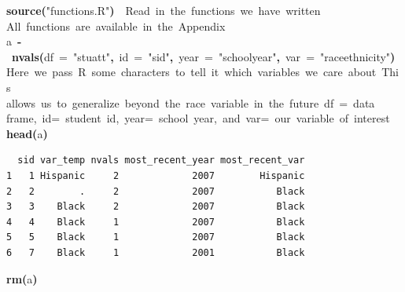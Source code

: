 \documentclass[12pt]{article}
\makeatletter
\newcommand{\hlfunctioncall}[1]{\textcolor[rgb]{0.501960784313725,0,0.329411764705882}{\textbf{#1}}}%
\newcommand{\hlstring}[1]{\textcolor[rgb]{0.6,0.6,1}{#1}}%
\newcommand{\hlkeyword}[1]{\textcolor[rgb]{0,0,0}{\textbf{#1}}}%
\newcommand{\hlargument}[1]{\textcolor[rgb]{0.690196078431373,0.250980392156863,0.0196078431372549}{#1}}%
\newcommand{\hlcomment}[1]{\textcolor[rgb]{0.180392156862745,0.6,0.341176470588235}{#1}}%
\newcommand{\hlassignement}[1]{\textcolor[rgb]{0,0,0}{\textbf{#1}}}%
\newcommand{\hlsymbol}[1]{\textcolor[rgb]{0,0,0}{#1}}%
\newcommand{\hlstd}[1]{\textcolor[rgb]{0,0,0}{#1}}%
\newenvironment{kframe}{%
 \def\FrameCommand##1{\hskip\@totalleftmargin \hskip-\fboxsep
 \colorbox{shadecolor}{##1}\hskip-\fboxsep
     \hskip-\linewidth \hskip-\@totalleftmargin \hskip\columnwidth}%
 \MakeFramed {\advance\hsize-\width
   \@totalleftmargin\z@ \linewidth\hsize
   \@setminipage}}%
 {\par\unskip\endMakeFramed}
\newenvironment{knitrout}{}{} %
\renewenvironment{knitrout}{\begin{footnotesize}}{\end{footnotesize}}
\makeatother
\begin{document}
\begin{knitrout}
\color{fgcolor}\begin{kframe}
\begin{flushleft}
\ttfamily\noindent
\hlfunctioncall{source}\hlkeyword{(}\hlstring{"{}functions.R"{}}\hlkeyword{)}{\ }{\ }\hlcomment{\usebox{\hlnormalsizeboxhash}{\ }Read{\ }in{\ }the{\ }functions{\ }we{\ }have{\ }written}\hspace*{\fill}\\
\hlstd{}\hlcomment{\usebox{\hlnormalsizeboxhash}{\ }All{\ }functions{\ }are{\ }available{\ }in{\ }the{\ }Appendix}\hspace*{\fill}\\
\hlstd{}\hlsymbol{a}{\ }\hlassignement{\usebox{\hlnormalsizeboxlessthan}-}{\ }\hlfunctioncall{nvals}\hlkeyword{(}\hlargument{df}{\ }\hlargument{=}{\ }\hlstring{"{}stuatt"{}}\hlkeyword{,}{\ }\hlargument{id}{\ }\hlargument{=}{\ }\hlstring{"{}sid"{}}\hlkeyword{,}{\ }\hlargument{year}{\ }\hlargument{=}{\ }\hlstring{"{}school\usebox{\hlnormalsizeboxunderscore}year"{}}\hlkeyword{,}{\ }\hlargument{var}{\ }\hlargument{=}{\ }\hlstring{"{}race\usebox{\hlnormalsizeboxunderscore}ethnicity"{}}\hlkeyword{)}\hspace*{\fill}\\
\hlstd{}\hlcomment{\usebox{\hlnormalsizeboxhash}{\ }Here{\ }we{\ }pass{\ }R{\ }some{\ }characters{\ }to{\ }tell{\ }it{\ }which{\ }variables{\ }we{\ }care{\ }about{\ }This}\hspace*{\fill}\\
\hlstd{}\hlcomment{\usebox{\hlnormalsizeboxhash}{\ }allows{\ }us{\ }to{\ }generalize{\ }beyond{\ }the{\ }race{\ }variable{\ }in{\ }the{\ }future{\ }df{\ }={\ }data}\hspace*{\fill}\\
\hlstd{}\hlcomment{\usebox{\hlnormalsizeboxhash}{\ }frame,{\ }id={\ }student{\ }id,{\ }year={\ }school{\ }year,{\ }and{\ }var={\ }our{\ }variable{\ }of{\ }interest}\hspace*{\fill}\\
\hlstd{}\hlfunctioncall{head}\hlkeyword{(}\hlsymbol{a}\hlkeyword{)}\mbox{}
\normalfont
\end{flushleft}
\begin{verbatim}
  sid var_temp nvals most_recent_year most_recent_var
1   1 Hispanic     2             2007        Hispanic
2   2        .     2             2007           Black
3   3    Black     2             2007           Black
4   4    Black     1             2007           Black
5   5    Black     1             2007           Black
6   7    Black     1             2001           Black
\end{verbatim}
\begin{flushleft}
\ttfamily\noindent
\hlfunctioncall{rm}\hlkeyword{(}\hlsymbol{a}\hlkeyword{)}\mbox{}
\normalfont
\end{flushleft}
\end{kframe}
\end{knitrout}
\end{document}
